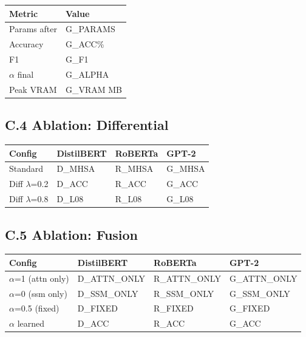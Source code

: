 \begin{table}[H]
\centering
\small
\begin{tabular}{ll}
\toprule
\textbf{Metric} & \textbf{Value} \\
\midrule
Params after & {{G\_PARAMS}} \\
Accuracy & {{G\_ACC}}\% \\
F1 & {{G\_F1}} \\
$\alpha$ final & {{G\_ALPHA}} \\
Peak VRAM & {{G\_VRAM}} MB \\
\bottomrule
\end{tabular}
\end{table}

\subsection{C.4 Ablation: Differential}

\begin{table}[H]
\centering
\small
\begin{tabular}{llll}
\toprule
\textbf{Config} & \textbf{DistilBERT} & \textbf{RoBERTa} & \textbf{GPT-2} \\
\midrule
Standard & {{D\_MHSA}} & {{R\_MHSA}} & {{G\_MHSA}} \\
Diff $\lambda$=0.2 & {{D\_ACC}} & {{R\_ACC}} & {{G\_ACC}} \\
Diff $\lambda$=0.8 & {{D\_L08}} & {{R\_L08}} & {{G\_L08}} \\
\bottomrule
\end{tabular}
\end{table}

\subsection{C.5 Ablation: Fusion}

\begin{table}[H]
\centering
\small
\begin{tabular}{llll}
\toprule
\textbf{Config} & \textbf{DistilBERT} & \textbf{RoBERTa} & \textbf{GPT-2} \\
\midrule
$\alpha$=1 (attn only) & {{D\_ATTN\_ONLY}} & {{R\_ATTN\_ONLY}} & {{G\_ATTN\_ONLY}} \\
$\alpha$=0 (ssm only) & {{D\_SSM\_ONLY}} & {{R\_SSM\_ONLY}} & {{G\_SSM\_ONLY}} \\
$\alpha$=0.5 (fixed) & {{D\_FIXED}} & {{R\_FIXED}} & {{G\_FIXED}} \\
$\alpha$ learned & {{D\_ACC}} & {{R\_ACC}} & {{G\_ACC}} \\
\bottomrule
\end{tabular}
\end{table}

